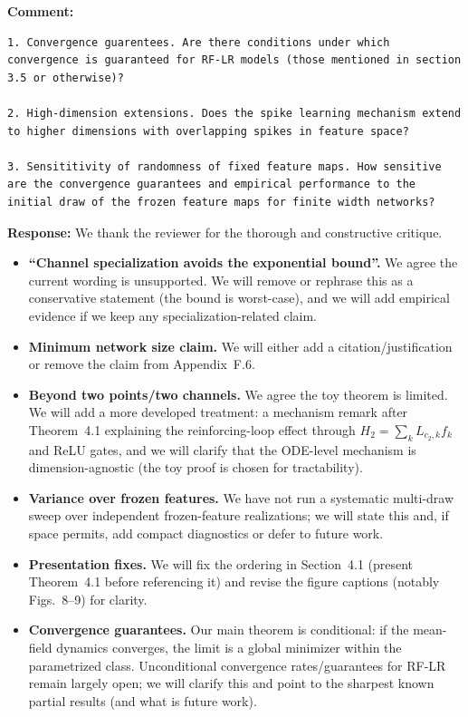\documentclass[11pt,a4paper]{article}
\begin{document}
\textbf{Comment:}
\begin{verbatim}
1. Convergence guarentees. Are there conditions under which convergence is guaranteed for RF-LR models (those mentioned in section 3.5 or otherwise)?

2. High-dimension extensions. Does the spike learning mechanism extend to higher dimensions with overlapping spikes in feature space?

3. Sensititivity of randomness of fixed feature maps. How sensitive are the convergence guarantees and empirical performance to the initial draw of the frozen feature maps for finite width networks?
\end{verbatim}
\textbf{Response:} We thank the reviewer for the thorough and constructive critique.
\begin{itemize}
  \item \textbf{``Channel specialization avoids the exponential bound''.} We agree the current wording is unsupported. We will remove or rephrase this as a conservative statement (the bound is worst-case), and we will add empirical evidence if we keep any specialization-related claim.
  \item \textbf{Minimum network size claim.} We will either add a citation/justification or remove the claim from Appendix~F.6.
  \item \textbf{Beyond two points/two channels.} We agree the toy theorem is limited. We will add a more developed treatment: a mechanism remark after Theorem~4.1 explaining the reinforcing-loop effect through $H_2=\sum_k L_{c_2,k}f_k$ and ReLU gates, and we will clarify that the ODE-level mechanism is dimension-agnostic (the toy proof is chosen for tractability).
  \item \textbf{Variance over frozen features.} We have not run a systematic multi-draw sweep over independent frozen-feature realizations; we will state this and, if space permits, add compact diagnostics or defer to future work.
  \item \textbf{Presentation fixes.} We will fix the ordering in Section~4.1 (present Theorem~4.1 before referencing it) and revise the figure captions (notably Figs.~8--9) for clarity.
  \item \textbf{Convergence guarantees.} Our main theorem is conditional: if the mean-field dynamics converges, the limit is a global minimizer within the parametrized class. Unconditional convergence rates/guarantees for RF-LR remain largely open; we will clarify this and point to the sharpest known partial results (and what is future work).

\end{itemize}
\end{document}
